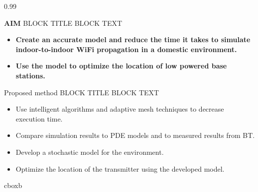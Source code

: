 \documentclass[final]{beamer}
\theoremstyle{plain}
\theoremstyle{definition}
\theoremstyle{remark}
\newlength{\twocolwid}
\begin{document}
\begin{frame}[t]
\begin{columns}[t]
\begin{column}{0.99\twocolwid}
\begin{mdframed}[backgroundcolor=white, userdefinedwidth=0.999999\linewidth]
    \end{mdframed}
    \vspace{1.5cm}
    
\begin{alertblock}{\textbf{AIM} BLOCK TITLE
}
BLOCK TEXT
\begin{itemize}
\item \textbf{Create an accurate model and reduce the time it takes to simulate indoor-to-indoor WiFi propagation in a domestic environment.}
\item \textbf{Use the model to optimize the location of low powered base stations.
}
\end{itemize}
\end{alertblock}
\vspace{-1cm}




\begin{block}{Proposed method BLOCK TITLE
}
\vspace{-2cm}
BLOCK TEXT
\begin{itemize}
\item Use intelligent algorithms and adaptive mesh techniques to decrease execution time.
\item Compare simulation results to PDE models and to measured results from BT.
\item Develop a stochastic model for the environment.
\item Optimize the location of the transmitter using the developed model.
\end{itemize}
\end{block}
 
 \vspace{-2cm}
 \hspace{0.5in}
 \begin{beamercolorbox}[wd=14in,colsep=0.15cm]{cboxb}
 \end{beamercolorbox}
 \vspace{2cm}


\end{column}
\end{columns}
\end{frame}
\end{document}
